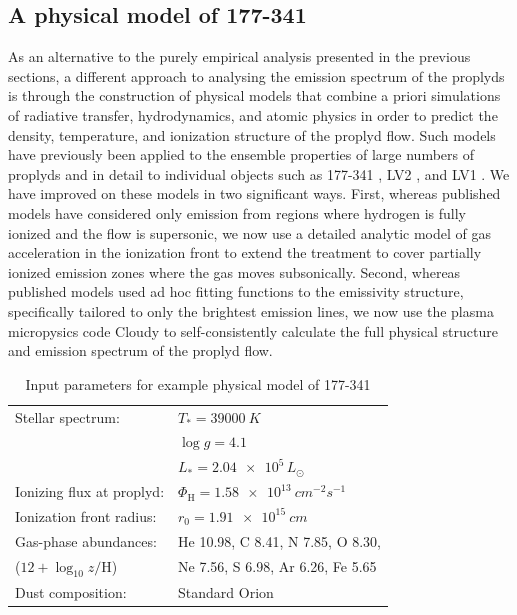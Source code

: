 \documentclass[useAMS,usenatbib]{mn2e}
\begin{document}
\addtocounter{section}{6}
\addtocounter{subsection}{2}
\addtocounter{table}{5}
\addtocounter{figure}{9}


\subsection{A physical model of 177-341}
As an alternative to the purely empirical analysis presented in the previous sections, a different approach to analysing the emission spectrum of the proplyds is through the construction of physical models that combine a priori simulations of radiative transfer, hydrodynamics, and atomic physics in order to predict the density, temperature, and ionization structure of the proplyd flow.  
Such models have previously been applied to the ensemble properties of large numbers of proplyds \citep*{1998ApJ...499..758J, 1998AJ....116..322H} and in detail to individual objects such as 177-341 \citep{1999AJ....118.2350H}, LV2 \citep{2002ApJ...566..315H}, and LV1 \citep{2002ApJ...570..222G}. 
We have improved on these models in two significant ways.
First, whereas published models have considered only emission from regions where hydrogen is fully ionized and the flow is supersonic, we now use a detailed analytic model of gas acceleration in the ionization front \citep{2005ApJ...621..328H} to extend the treatment to cover partially ionized emission zones where the gas moves subsonically. 
Second, whereas published models used ad hoc fitting functions to the emissivity structure, specifically tailored to only the brightest emission lines, we now use the plasma micropysics code Cloudy \citep{1998PASP..110..761F} to self-consistently calculate the full physical structure and emission spectrum of the proplyd flow. 

\begin{table}
  \centering
  \caption{Input parameters for example physical model of 177-341} 
  \begin{tabular}{@{\,}ll@{\,}}\hline
    Stellar spectrum:& 
    \(T_* = \SI{39000}{K}\)\\
    \citep{2006AandA...448..351S} & \(\log g = 4.1\)\\
    & \(L_* = \num{2.04e5}\,L_\odot\)\\
    Ionizing flux at proplyd:& 
    \(\Phi_{\mathrm{H}} = \SI{1.58e13}{cm^{-2} s^{-1}}\)
    \\
    Ionization front radius:& 
    \(r_0 = \SI{1.91e15}{cm}\)
    \\
    Gas-phase abundances: & 
    He 10.98, C 8.41, N 7.85, O 8.30, \\
    (\(12 + \log_{10} z/\mathrm{H}\)) & Ne 7.56, S 6.98, Ar 6.26, Fe 5.65
    \\
    Dust composition: & Standard Orion \citep{1991ApJ...374..580B}\\
    \hline
  \end{tabular}
  \label{tab:model:pars}
\end{table}
\end{document}
